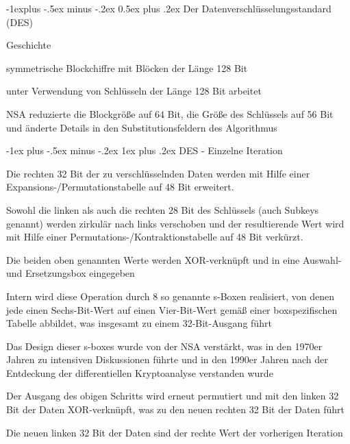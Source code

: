 \documentclass[a4paper]{article}
\makeatletter
\renewcommand{\subsection}{\@startsection{subsection}{2}{0mm}%
 {-1explus -.5ex minus -.2ex}%
 {0.5ex plus .2ex}%
 {\normalfont\normalsize\bfseries}}
\renewcommand{\subsubsection}{\@startsection{subsubsection}{3}{0mm}%
 {-1ex plus -.5ex minus -.2ex}%
 {1ex plus .2ex}%
 {\normalfont\small\bfseries}}
\makeatother
\begin{document}
\begin{multicols}{3}
      \subsection{Der Datenverschlüsselungsstandard (DES)}

      Geschichte
      \begin{itemize*}
            \item symmetrische Blockchiffre mit Blöcken der Länge 128 Bit
            \item unter Verwendung von Schlüsseln der Länge 128 Bit arbeitet
            \item NSA reduzierte die Blockgröße auf 64 Bit, die Größe des Schlüssels auf 56 Bit und änderte Details in den Substitutionsfeldern des Algorithmus
      \end{itemize*}

      \subsubsection{DES - Einzelne Iteration}
      \begin{itemize*}
            \item Die rechten 32 Bit der zu verschlüsselnden Daten werden mit Hilfe einer Expansions-/Permutationstabelle auf 48 Bit erweitert.
            \item Sowohl die linken als auch die rechten 28 Bit des Schlüssels (auch Subkeys genannt) werden zirkulär nach links verschoben und der resultierende Wert wird mit Hilfe einer Permutations-/Kontraktionstabelle auf 48 Bit verkürzt.
            \item Die beiden oben genannten Werte werden XOR-verknüpft und in eine Auswahl- und Ersetzungsbox eingegeben
            \begin{itemize*}
                  \item Intern wird diese Operation durch 8 so genannte s-Boxen realisiert, von denen jede einen Sechs-Bit-Wert auf einen Vier-Bit-Wert gemäß einer boxspezifischen Tabelle abbildet, was insgesamt zu einem 32-Bit-Ausgang führt
                  \item Das Design dieser s-boxes wurde von der NSA verstärkt, was in den 1970er Jahren zu intensiven Diskussionen führte und in den 1990er Jahren nach der Entdeckung der differentiellen Kryptoanalyse verstanden wurde
            \end{itemize*}
            \item Der Ausgang des obigen Schritts wird erneut permutiert und mit den linken 32 Bit der Daten XOR-verknüpft, was zu den neuen rechten 32 Bit der Daten führt
            \item Die neuen linken 32 Bit der Daten sind der rechte Wert der vorherigen Iteration
      \end{itemize*}


\end{multicols}
\end{document}
